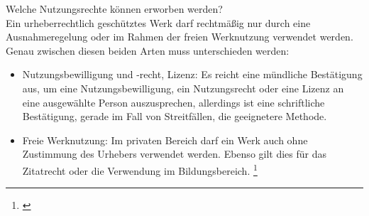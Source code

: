 \documentclass[titlepage,12pt,twoside]{article}
\begin{document}
\hfill \break
Welche Nutzungsrechte können erworben werden? \\
Ein urheberrechtlich geschütztes Werk darf rechtmäßig nur durch eine Ausnahmeregelung oder im Rahmen der 
freien Werknutzung verwendet werden. Genau zwischen diesen beiden Arten muss unterschieden werden: \\
\begin{itemize}
	\item Nutzungsbewilligung und -recht, Lizenz: Es reicht eine mündliche Bestätigung aus, um eine 
	Nutzungsbewilligung, ein Nutzungsrecht oder eine Lizenz an eine ausgewählte Person auszusprechen, 
	allerdings ist eine schriftliche Bestätigung, gerade im Fall von Streitfällen, die geeignetere Methode.
	\item Freie Werknutzung: Im privaten Bereich darf ein Werk auch ohne Zustimmung des Urhebers verwendet 
	werden. Ebenso gilt dies für das Zitatrecht oder die Verwendung im Bildungsbereich. \footnote{\cite{Saferinternet.p12}}
\end{itemize}
\hfill \break
\end{document}
